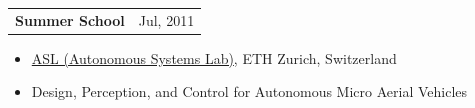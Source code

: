 \documentclass[margin,line]{res}
\newenvironment{list2}{
  \begin{list}{$\bullet$}{%
      \setlength{\itemsep}{0in}
      \setlength{\parsep}{0in} \setlength{\parskip}{0in}
      \setlength{\topsep}{0in} \setlength{\partopsep}{0in} 
      \setlength{\leftmargin}{0.2in}}}{\end{list}}
\begin{document}
\begin{resume}
\begin{tabularx}{\textwidth}{X r}
{\bf Summer School} & Jul, 2011\\
\end{tabularx}
\begin{itemize}
\item[] \href{http://www.asl.ethz.ch}{ASL (Autonomous Systems Lab)}, ETH Zurich, Switzerland

\vspace*{-2.5mm}
\item[] Design, Perception, and Control for Autonomous Micro Aerial Vehicles
\end{itemize}

%


%


   



\end{resume}
\end{document}
